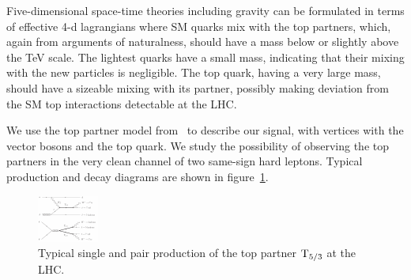 Five-dimensional space-time theories including gravity can be formulated in
terms of effective 4-d lagrangians where SM quarks mix with the top
partners, which, again from arguments of naturalness, should have a mass below or
slightly above the \unit[]{TeV} scale.
The lightest quarks have a small mass, indicating that their mixing with the
new particles is negligible. The top quark, having a very large mass, should have
a sizeable mixing with its partner, possibly making deviation
from the SM top interactions detectable at the LHC.

We use the top partner model from~\cite{Mrazek:2009yu} to describe our
signal, with vertices with the vector bosons and the top quark. 
We study the possibility of observing the top partners in the very clean
channel of two same-sign hard leptons. Typical production and decay diagrams
are shown in figure~\ref{fig:T53_production}.

\begin{figure}[htb]
    \centering
    \includegraphics[width=.9\textwidth]{images/pdf/T53_production}
    \caption{Typical single and pair production of the top partner $\mathrm{T}_{5/3}$ at the
    LHC.}
    \label{fig:T53_production}
\end{figure}
